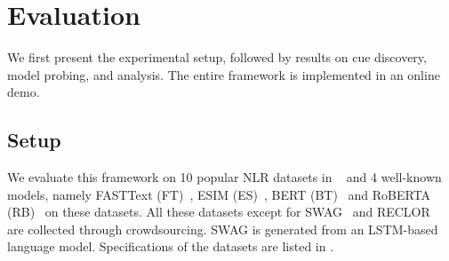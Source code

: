 \section{Evaluation}
\label{sec:eval}
We first present the experimental setup, followed by results on cue discovery, 
model probing, and analysis. 
The entire framework is implemented in an online demo. 

\subsection{Setup} 
We evaluate this framework on 10 popular NLR datasets in ~ and
4 well-known models, namely FASTText (FT)~\cite{joulin2017bag}, 
ESIM (ES)~\cite{chen2016enhanced}, BERT (BT)~\cite{devlin2018bert} and RoBERTA (RB)~\cite{liu2019roberta}
on these datasets. All these datasets except for 
SWAG~\cite{zellers2018swag} and RECLOR~\cite{yu2020reclor} are collected
through crowdsourcing. SWAG is generated from an LSTM-based language model.
Specifications of the datasets are listed in .

